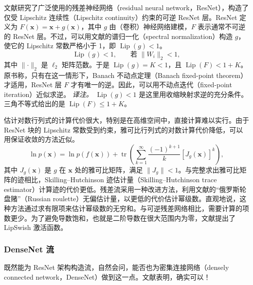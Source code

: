 文献研究了广泛使用的残差神经网络（residual neural network，ResNet），构造了仅受 Lipschitz 连续性（Lipschitz continuity）约束的可逆 ResNet 层。ResNet 定义为 $F(\mathbf{x})=\mathbf{x}+g(\mathbf{x})$，其中 $g$ 由（卷积）神经网络建模，$F$ 表示通常不可逆的 ResNet 层。不过，可以用文献的谱归一化（spectral normalization）构造 $g$，使它的 Lipschitz 常数严格小于 1，即 $\operatorname{Lip}(g)<1$。
\begin{equation}
\operatorname{Lip}(g)<1,\qquad\text{若 }\lVert W_i\rVert_2<1,
\tag{4.23}\label{eq:04-23}
\end{equation}
其中 $\lVert\cdot\rVert_2$ 是 $\ell_2$ 矩阵范数。于是 $\operatorname{Lip}(g)=K<1$，且 $\operatorname{Lip}(F)<1+K$。原书称，只有在这一情形下，Banach 不动点定理（Banach fixed-point theorem）才适用，ResNet 层 $F$ 才有唯一的逆。因此，可以用不动点迭代（fixed-point iteration）近似求逆。
\emph{译注。} $\operatorname{Lip}(g)<1$ 是这里用收缩映射求逆的充分条件。三角不等式给出的是 $\operatorname{Lip}(F)\le 1+K$。

估计对数行列式的计算代价很大，特别是在高维空间中，直接计算难以实行。由于 ResNet 块的 Lipschitz 常数受到约束，雅可比行列式的对数计算代价降低，可以用保证收敛的方法近似。
\begin{equation}
\ln p(\mathbf{x})=\ln p(f(\mathbf{x}))+
\operatorname{tr}\left(\sum_{k=1}^\infty\frac{(-1)^{k+1}}{k}[J_g(\mathbf{x})]^k\right),
\tag{4.24}\label{eq:04-24}
\end{equation}
其中 $J_g(\mathbf{x})$ 是 $g$ 在 $\mathbf{x}$ 处的雅可比矩阵，满足 $\lVert J_g\rVert<1$。与完整求出雅可比矩阵的迹相比，Skilling–Hutchinson 迹估计量（Skilling–Hutchinson trace estimator）计算迹的代价更低。残差流采用一种改进方法，利用文献的“俄罗斯轮盘赌”（Russian roulette）无偏估计量，以更低的代价估计幂级数。直观地说，这种方法通过求有限项来估计幂级数的无穷和。与可逆残差网络相比，需要计算的项数更少。为了避免导数饱和，也就是二阶导数在很大范围内为零，文献提出了 LipSwish 激活函数。

\subsubsection[DenseNet 流]{DenseNet 流}

既然能为 ResNet 架构构造流，自然会问，能否也为密集连接网络（densely connected network，DenseNet）做到这一点。文献表明，确实可以！

